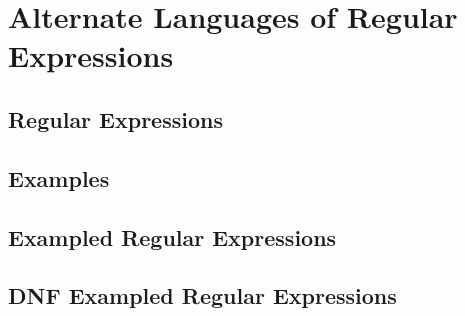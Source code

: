 \section{Alternate Languages of Regular Expressions}
\subsection{Regular Expressions}
\subsection{Examples}
\subsection{Exampled Regular Expressions}
\subsection{DNF Exampled Regular Expressions}
